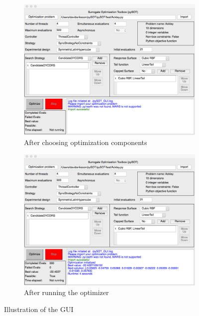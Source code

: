 \documentclass[]{article}
\begin{document}
\begin{figure}
    \hfill
        \begin{subfigure}{0.49\textwidth}\centering
                    \includegraphics[width=\linewidth]{./Pics/GUI3}
                \caption{After choosing optimization components}
  \label{fig:Third_figure}
       \end{subfigure}%
    \hfill
        \begin{subfigure}{0.49\textwidth}\centering
                    \includegraphics[width=\linewidth]{./Pics/GUI4}
                \caption{After running the optimizer}
  \label{fig:First_figure}
       \end{subfigure}%
       \caption{Illustration of the GUI}
 \label{fig:gui}
 \end{figure}
 
\end{document}
